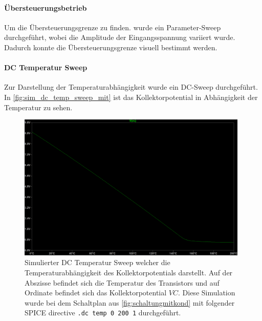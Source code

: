 \documentclass[12pt,english,ngerman]{scrartcl}
\begin{document}
\paragraph{Übersteuerungsbetrieb}

Um die Übersteuerungsgrenze zu finden. wurde ein Parameter-Sweep durchgeführt,
wobei die Amplitude der Eingangsspannung variiert wurde. Dadurch konnte die
Übersteuerungsgrenze visuell bestimmt werden.



\paragraph{DC Temperatur Sweep}
Zur Darstellung der Temperaturabhängigkeit wurde ein DC-Sweep durchgeführt. In \autoref{fig:sim_dc_temp_sweep_mit} ist das Kollektorpotential in Abhängigkeit der Temperatur zu sehen.
\begin{figure}[H]
  \centering
    \includegraphics[width=\linewidth, height=7cm]{./figures/mitkond/tempmitkondkollektorpot.png}
    \caption[Simulierter DC Temperatur Sweep mit
    Überbrückungskondensator]{Simulierter DC Temperatur Sweep welcher die
      Temperaturabhängigkeit des Kollektorpotentials darstellt. Auf der
      Abszisse befindet sich die Temperatur des Transistors und auf Ordinate
      befindet sich das Kollektorpotential $VC$. Diese Simulation wurde bei dem
      Schaltplan aus \autoref{fig:schaltungmitkond} mit folgender SPICE
      directive \texttt{.dc temp 0 200 1} durchgeführt.
  }
  \label{fig:sim_dc_temp_sweep_mit}
\end{figure}
\end{document}
